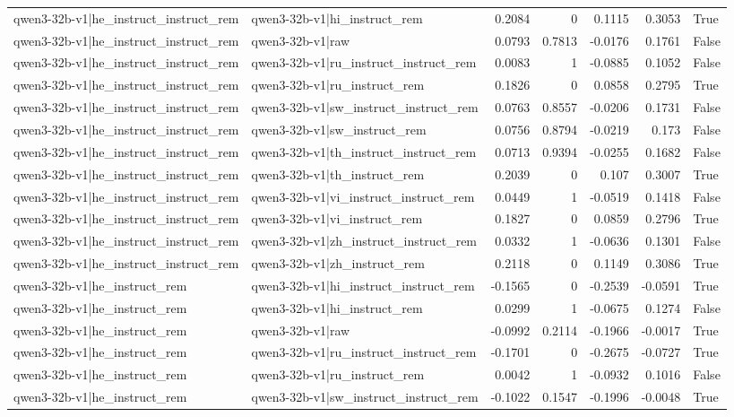 \begin{table}
\begin{tabular}{l l r r r r l}
qwen3-32b-v1|he_instruct_instruct_rem & qwen3-32b-v1|hi_instruct_rem & 0.2084 & 0 & 0.1115 & 0.3053 & True \\
qwen3-32b-v1|he_instruct_instruct_rem & qwen3-32b-v1|raw & 0.0793 & 0.7813 & -0.0176 & 0.1761 & False \\
qwen3-32b-v1|he_instruct_instruct_rem & qwen3-32b-v1|ru_instruct_instruct_rem & 0.0083 & 1 & -0.0885 & 0.1052 & False \\
qwen3-32b-v1|he_instruct_instruct_rem & qwen3-32b-v1|ru_instruct_rem & 0.1826 & 0 & 0.0858 & 0.2795 & True \\
qwen3-32b-v1|he_instruct_instruct_rem & qwen3-32b-v1|sw_instruct_instruct_rem & 0.0763 & 0.8557 & -0.0206 & 0.1731 & False \\
qwen3-32b-v1|he_instruct_instruct_rem & qwen3-32b-v1|sw_instruct_rem & 0.0756 & 0.8794 & -0.0219 & 0.173 & False \\
qwen3-32b-v1|he_instruct_instruct_rem & qwen3-32b-v1|th_instruct_instruct_rem & 0.0713 & 0.9394 & -0.0255 & 0.1682 & False \\
qwen3-32b-v1|he_instruct_instruct_rem & qwen3-32b-v1|th_instruct_rem & 0.2039 & 0 & 0.107 & 0.3007 & True \\
qwen3-32b-v1|he_instruct_instruct_rem & qwen3-32b-v1|vi_instruct_instruct_rem & 0.0449 & 1 & -0.0519 & 0.1418 & False \\
qwen3-32b-v1|he_instruct_instruct_rem & qwen3-32b-v1|vi_instruct_rem & 0.1827 & 0 & 0.0859 & 0.2796 & True \\
qwen3-32b-v1|he_instruct_instruct_rem & qwen3-32b-v1|zh_instruct_instruct_rem & 0.0332 & 1 & -0.0636 & 0.1301 & False \\
qwen3-32b-v1|he_instruct_instruct_rem & qwen3-32b-v1|zh_instruct_rem & 0.2118 & 0 & 0.1149 & 0.3086 & True \\
qwen3-32b-v1|he_instruct_rem & qwen3-32b-v1|hi_instruct_instruct_rem & -0.1565 & 0 & -0.2539 & -0.0591 & True \\
qwen3-32b-v1|he_instruct_rem & qwen3-32b-v1|hi_instruct_rem & 0.0299 & 1 & -0.0675 & 0.1274 & False \\
qwen3-32b-v1|he_instruct_rem & qwen3-32b-v1|raw & -0.0992 & 0.2114 & -0.1966 & -0.0017 & True \\
qwen3-32b-v1|he_instruct_rem & qwen3-32b-v1|ru_instruct_instruct_rem & -0.1701 & 0 & -0.2675 & -0.0727 & True \\
qwen3-32b-v1|he_instruct_rem & qwen3-32b-v1|ru_instruct_rem & 0.0042 & 1 & -0.0932 & 0.1016 & False \\
qwen3-32b-v1|he_instruct_rem & qwen3-32b-v1|sw_instruct_instruct_rem & -0.1022 & 0.1547 & -0.1996 & -0.0048 & True \\

\end{tabular}
\end{table}
